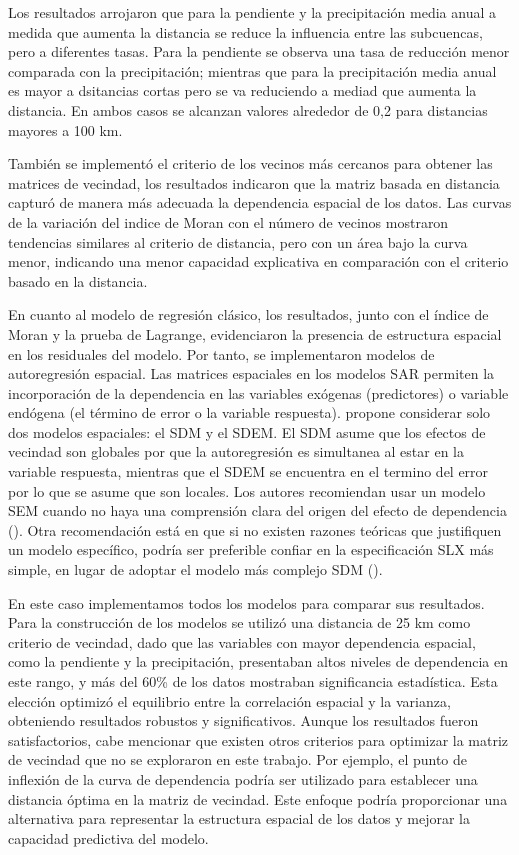 \documentclass[
  manuscript=article,  
  layout=preprint,  
  year=2023,
  volume=0,
]{format}
\begin{document}
Los resultados arrojaron que para la pendiente y la precipitación media anual a medida que aumenta la distancia se reduce la influencia entre las subcuencas, pero a diferentes tasas. Para la pendiente se observa una tasa de reducción menor comparada con la precipitación; mientras que para la precipitación media anual es mayor a dsitancias cortas pero se va reduciendo a mediad que aumenta la distancia. En ambos casos se alcanzan valores alrededor de 0,2 para distancias mayores a 100 km. 

También se implementó el criterio de los vecinos más cercanos para obtener las matrices de vecindad, los resultados indicaron que la matriz basada en distancia capturó de manera más adecuada la dependencia espacial de los datos. Las curvas de la variación del indice de Moran con el número de vecinos mostraron tendencias similares al criterio de distancia, pero con un área bajo la curva menor, indicando una menor capacidad explicativa en comparación con el criterio basado en la distancia.

En cuanto al modelo de regresión clásico, los resultados, junto con el índice de Moran y la prueba de Lagrange, evidenciaron la presencia de estructura espacial en los residuales del modelo. Por tanto, se implementaron modelos de autoregresión espacial. Las matrices espaciales en los modelos SAR permiten la incorporación de la dependencia en las variables exógenas (predictores) o variable endógena (el término de error o la variable respuesta). \cite{lesage2014spatial} propone considerar solo dos modelos espaciales: el SDM y el SDEM. El SDM asume que los efectos de vecindad son globales por que la autoregresión es simultanea al estar en la variable respuesta, mientras que el SDEM se encuentra en el termino del error por lo que se asume que son locales. Los autores recomiendan usar un modelo SEM cuando no haya una comprensión clara del origen del efecto de dependencia (\cite{elhorst2014spatial}). Otra recomendación está en que si no existen razones teóricas que justifiquen un modelo específico, podría ser preferible confiar en la especificación SLX más simple, en lugar de adoptar el modelo más complejo SDM (\cite{halleck2017regional, halleck2015slx}).

En este caso implementamos todos los modelos para comparar sus resultados. Para la construcción de los modelos se utilizó una distancia de 25 km como criterio de vecindad, dado que las variables con mayor dependencia espacial, como la pendiente y la precipitación, presentaban altos niveles de dependencia en este rango, y más del 60\% de los datos mostraban significancia estadística. Esta elección optimizó el equilibrio entre la correlación espacial y la varianza, obteniendo resultados robustos y significativos. Aunque los resultados fueron satisfactorios, cabe mencionar que existen otros criterios para optimizar la matriz de vecindad que no se exploraron en este trabajo. Por ejemplo, el punto de inflexión de la curva de dependencia podría ser utilizado para establecer una distancia óptima en la matriz de vecindad. Este enfoque podría proporcionar una alternativa para representar la estructura espacial de los datos y mejorar la capacidad predictiva del modelo.
\end{document}
